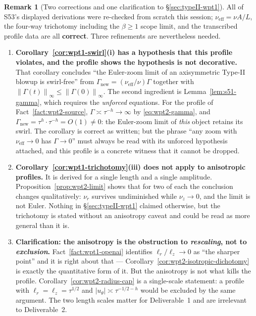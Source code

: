 \documentclass[11pt]{article}
\theoremstyle{definition}
\newtheorem{remark}[theorem]{Remark}
\theoremstyle{remark}
\newcommand{\norm}[1]{\left\|#1\right\|}
\newcommand{\abs}[1]{\left|#1\right|}
\begin{document}
\begin{remark}[Two corrections and one clarification to
  \S\ref{sec:typeII-wpt1}]\label{rem:wpt2-s53-corrections}
  All of S53's displayed derivations were re-checked from scratch this
  session; $\nu_{\mathrm{eff}}=\nu A/L$, the four-way trichotomy including
  the $\beta\geq1$ scope limit, and the transcribed profile data are all
  \textbf{correct}. Three refinements are nevertheless needed.
  \begin{enumerate}[label=(\arabic*)]
    \item \textbf{Corollary~\ref{cor:wpt1-swirl}(i) has a hypothesis that
      this profile violates, and the profile shows the hypothesis is not
      decorative.} That corollary concludes ``the Euler-zoom limit of an
      axisymmetric Type-II blowup is swirl-free'' from
      $\Gamma_{\mathrm{new}}=(\nu_{\mathrm{eff}}/\nu)\Gamma$ together with
      $\norm{\Gamma(t)}_\infty\leq\norm{\Gamma(0)}_\infty$. The second
      ingredient is Lemma~\ref{lem:s51-gamma}, which requires the
      \emph{unforced} equations. For the profile of
      Fact~\ref{fact:wpt2-source}, $\Gamma\asymp\tau^{-h}\to\infty$ by
      \eqref{eq:wpt2-gamma}, and
      $\Gamma_{\mathrm{new}}=\tau^{h}\cdot\tau^{-h}=O(1)\neq0$: the
      Euler-zoom limit of \emph{this} object retains its swirl. The
      corollary is correct as written; but the phrase ``any zoom with
      $\nu_{\mathrm{eff}}\to0$ has $\Gamma\to0$'' must always be read with
      its unforced hypothesis attached, and this profile is a concrete
      witness that it cannot be dropped.
    \item \textbf{Corollary~\ref{cor:wpt1-trichotomy}(iii) does not apply to
      anisotropic profiles.} It is derived for a single length and a single
      amplitude. Proposition~\ref{prop:wpt2-limit} shows that for two of
      each the conclusion changes qualitatively: $\nu_r$ survives
      undiminished while $\nu_z\to0$, and the limit is not Euler. Nothing in
      \S\ref{sec:typeII-wpt1} claimed otherwise, but the trichotomy is
      stated without an anisotropy caveat and could be read as more general
      than it is.
    \item \textbf{Clarification: the anisotropy is the obstruction to
      \emph{rescaling}, not to \emph{exclusion}.}
      Fact~\ref{fact:wpt1-openai} identifies $\ell_r/\ell_z\to0$ as ``the
      sharper point'' and it is right about that ---
      Corollary~\ref{cor:wpt2-isotropic-dichotomy} is exactly the
      quantitative form of it. But the anisotropy is not what kills the
      profile. Corollary~\ref{cor:wpt2-radius-cap} is a single-scale
      statement: a profile with $\ell_r=\ell_z=\tau^{1/2}$ and
      $\abs{u_\theta}\asymp\tau^{-1/2-h}$ would be excluded by the same
      argument. The two length scales matter for Deliverable~1 and are
      irrelevant to Deliverable~2.
  \end{enumerate}
\end{remark}
\end{document}
